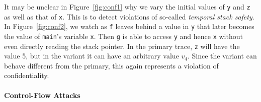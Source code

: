 \documentclass[acmsmall,review,anonymous]{acmart}\settopmatter{printfolios=true,printccs=false,printacmref=false}
\begin{document}
It may be unclear in Figure~\ref{fig:conf1} why we vary the initial values of {\tt y}
and {\tt z} as well as that of {\tt x}. This is to detect violations of so-called
{\em temporal stack safety}.
In Figure~\ref{fig:conf2}, we watch as {\tt f} leaves behind a value in {\tt y}
that later becomes the value of {\tt main}'s variable {\tt x}. Then {\tt g} is able to access
{\tt y} and hence {\tt x} without even directly reading the stack pointer.
In the primary trace, {\tt z} will have the value 5, but in the variant it can have
an arbitrary value $v_4$.  Since the variant can behave different from the primary,
this again represents a violation of confidentiality.

\paragraph*{Control-Flow Attacks}
\end{document}

